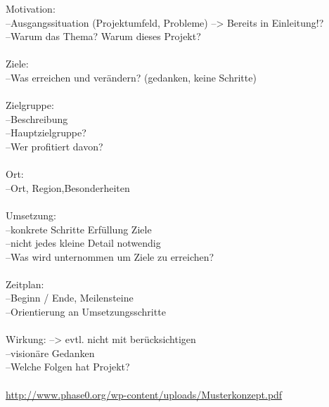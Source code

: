 Motivation:\\
--Ausgangssituation (Projektumfeld, Probleme) --> Bereits in Einleitung!?\\
--Warum das Thema? Warum dieses Projekt?\\\\
Ziele:\\
--Was erreichen und verändern? (gedanken, keine Schritte)\\\\
Zielgruppe:\\
--Beschreibung\\
--Hauptzielgruppe?\\
--Wer profitiert davon?\\\\
Ort:\\
--Ort, Region,Besonderheiten\\\\
Umsetzung:\\
--konkrete Schritte Erfüllung Ziele\\
--nicht jedes kleine Detail notwendig\\
--Was wird unternommen um Ziele zu erreichen?\\\\
Zeitplan:\\
--Beginn / Ende, Meilensteine\\
--Orientierung an Umsetzungsschritte\\\\
Wirkung: --> evtl. nicht mit berücksichtigen\\
--visionäre Gedanken\\
--Welche Folgen hat Projekt?\\\\
\url{http://www.phase0.org/wp-content/uploads/Musterkonzept.pdf}